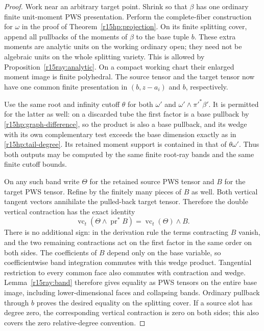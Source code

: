 \begin{proof}
Work near an arbitrary target point.  Shrink so that $\beta$
has one ordinary finite unit-moment PWS presentation.  Perform
the complete-fiber construction for $\omega$ in the proof of
Theorem~\ref{r15hp:projection}.  On its finite splitting cover,
append all pullbacks of the moments of $\beta$ to the base
tuple $b$.  These extra moments are analytic units on the
working ordinary open; they need not be algebraic units on the
whole splitting variety.  This is allowed by
Proposition~\ref{r15ray:analytic}.  On a compact working chart
their enlarged moment image is finite polyhedral.  The source
tensor and the target tensor now have one common finite
presentation in $(b,z-a_i)$ and $b$, respectively.

Use the same root and infinity cutoff $\theta$ for both
$\omega'$ and $\omega'\wedge\pi'^*\beta'$.  It is permitted
for the latter as well: on a discarded tube the first factor
is a base pullback by \eqref{r15hp:graph-difference}, so the
product is also a base pullback, and its wedge with its own
complementary test exceeds the base dimension exactly as in
\eqref{r15hp:tail-degree}.  Its retained moment support is
contained in that of $\theta\omega'$.  Thus both outputs may
be computed by the same finite root-ray bands and the same
finite cutoff bounds.

On any such band write $\Theta$ for the retained source PWS
tensor and $B$ for the target PWS tensor.  Refine by the finitely
many pieces of $B$ as well.  Both vertical tangent vectors
annihilate the pulled-back target tensor.  Therefore the double
vertical contraction has the exact identity
\[
 \operatorname{vc}_t(\Theta\wedge\operatorname{pr}^*B)
                         =\operatorname{vc}_t(\Theta)\wedge B.
\]
There is no additional sign: in the derivation rule the terms
contracting $B$ vanish, and the two remaining contractions
act on the first factor in the same order on both sides.
The coefficients of $B$ depend only on the base variable, so
coefficientwise band integration commutes with this wedge
product.  Tangential restriction to every common face also
commutes with contraction and wedge.  Lemma~\ref{r15ray:band}
therefore gives equality as PWS tensors on the entire base
image, including lower-dimensional faces and collapsing bands.
Ordinary pullback through $b$ proves the desired equality on
the splitting cover.  If a source slot has degree zero, the
corresponding vertical contraction is zero on both sides;
this also covers the zero relative-degree convention.


\end{proof}
